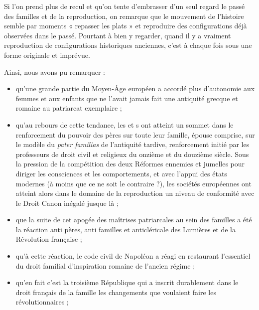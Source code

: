 
 Si l'on prend plus de recul et qu'on tente d'embrasser d'un seul regard le passé des familles et de la reproduction, on remarque que le mouvement de l'histoire semble par moments « repasser les plats » et reproduire des configurations déjà observées dans le passé. Pourtant à bien y regarder, quand il y a vraiment reproduction de configurations historiques anciennes, c'est à chaque fois sous une forme originale et imprévue. 
 
 Ainsi, nous avons pu remarquer : 
\begin{itemize}

\item qu'une grande partie du Moyen-Âge européen a accordé plus d'autonomie aux femmes et aux enfants que ne l'avait jamais fait une antiquité grecque et romaine au patriarcat exemplaire ;

\item qu'au rebours de cette tendance, les  et s ont atteint un sommet dans le renforcement du pouvoir des pères sur toute leur famille, épouse comprise, sur le modèle du \emph{pater familias} de l'antiquité tardive, renforcement initié par les professeurs de droit civil et religieux du onzième et du douzième siècle. Sous la pression de la compétition des deux Réformes ennemies et jumelles pour diriger les consciences et les comportements, et avec l'appui des états modernes (à moins que ce ne soit le contraire ?), les sociétés européennes ont atteint alors dans le domaine de la reproduction un niveau de conformité avec le Droit Canon inégalé jusque là ;

\item que la suite de cet apogée des maîtrises patriarcales au sein des familles a été la réaction anti pères, anti familles et anticléricale des Lumières et de la Révolution française ;

\item qu'à cette réaction, le code civil de Napoléon a réagi en restaurant l'essentiel du droit familial d'inspiration romaine de l'ancien régime ;
 
\item qu'en fait c'est la troisième République qui a inscrit durablement dans le droit français de la famille les changements que voulaient faire les révolutionnaires ;
 

\end{itemize}
